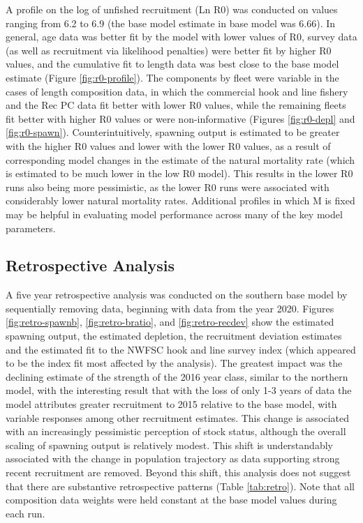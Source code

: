 \documentclass[11pt,
  english,
  a4paper,
]{article}
\begin{document}
A profile on the log of unfished recruitment (Ln R0) was conducted on values ranging from 6.2 to 6.9 (the base model estimate in base model was 6.66). In general, age data was better fit by the model with lower values of R0, survey data (as well as recruitment via likelihood penalties) were better fit by higher R0 values, and the cumulative fit to length data was best close to the base model estimate (Figure \ref{fig:r0-profile}). The components by fleet were variable in the cases of length composition data, in which the commercial hook and line fishery and the Rec PC data fit better with lower R0 values, while the remaining fleets fit better with higher R0 values or were non-informative (Figures \ref{fig:r0-depl} and \ref{fig:r0-spawn}). Counterintuitively, spawning output is estimated to be greater with the higher R0 values and lower with the lower R0 values, as a result of corresponding model changes in the estimate of the natural mortality rate (which is estimated to be much lower in the low R0 model). This results in the lower R0 runs also being more pessimistic, as the lower R0 runs were associated with considerably lower natural mortality rates. Additional profiles in which M is fixed may be helpful in evaluating model performance across many of the key model parameters.


\hypertarget{retrospective-analysis}{%
\subsection{Retrospective Analysis}\label{retrospective-analysis}}

\leavevmode\tagmcend\tagstructend

A five year retrospective analysis was conducted on the southern base model by sequentially removing data, beginning with data from the year 2020. Figures \ref{fig:retro-spawnb}, \ref{fig:retro-bratio}, and \ref{fig:retro-recdev} show the estimated spawning output, the estimated depletion, the recruitment deviation estimates and the estimated fit to the NWFSC hook and line survey index (which appeared to be the index fit most affected by the analysis). The greatest impact was the declining estimate of the strength of the 2016 year class, similar to the northern model, with the interesting result that with the loss of only 1-3 years of data the model attributes greater recruitment to 2015 relative to the base model, with variable responses among other recruitment estimates. This change is associated with an increasingly pessimistic perception of stock status, although the overall scaling of spawning output is relatively modest. This shift is understandably associated with the change in population trajectory as data supporting strong recent recruitment are removed. Beyond this shift, this analysis does not suggest that there are substantive retrospective patterns (Table \ref{tab:retro}). Note that all composition data weights were held constant at the base model values during each run.
\end{document}
